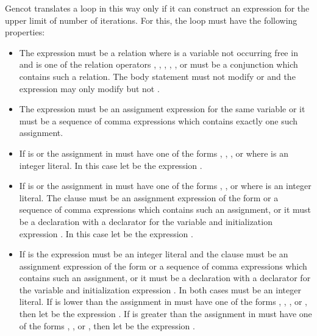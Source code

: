 Gencot translates a loop  in this way only if it can construct an expression  for the upper limit of
number of iterations. For this, the loop must have the following properties:
\begin{itemize}
\item The expression  must be a relation  where  is a variable not occurring free in 
and  is one of the relation operators \code{<}, \code{<=}, \code{>}, \code{>=}, \code{!=}, or  must be a 
conjunction which contains such a relation. The body statement  must not modify  or  and the expression 
 may only modify  but not .
\item The expression  must be an assignment expression for the same variable  or it must be a sequence of 
comma expressions which contains exactly one such assignment.
\item If  is \code{<} or \code{<=} the assignment in  must have one of the forms , ,
, or  where  is an integer literal. In this case let  be the expression .
\item If  is \code{>} or \code{>=} the assignment in  must have one of the forms , ,
or  where  is an integer literal. The clause  must be an assignment expression of the form 
 or a sequence of comma expressions which contains such an assignment, or it must be a declaration with a declarator 
for the variable  and initialization expression . In this case let  be the expression .
\item If  is \code{!=} the expression  must be an integer literal and the clause  must be an 
assignment expression of the form  or a sequence of comma expressions which contains such an assignment, or it 
must be a declaration with a declarator for the variable  and initialization expression . In both cases 
 must be an integer literal. If  is lower than  the assignment in  must have one of 
the forms , , , or , then let  be the expression . If 
is greater than  the assignment in  must have one of the forms , , or , 
then let  be the expression .
\end{itemize}

